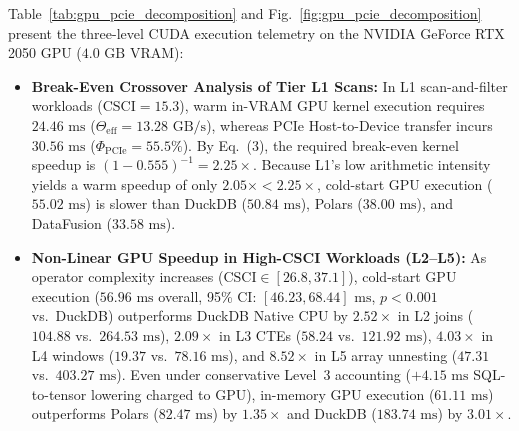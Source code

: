 \documentclass[10pt,a4paper]{article}
\begin{document}
Table~\ref{tab:gpu_pcie_decomposition} and Fig.~\ref{fig:gpu_pcie_decomposition} present the three-level CUDA execution telemetry on the NVIDIA GeForce RTX 2050 GPU ($4.0\text{ GB}$ VRAM):
\begin{itemize}[leftmargin=1.5em,itemsep=2pt]
    \item \textbf{Break-Even Crossover Analysis of Tier L1 Scans:} In L1 scan-and-filter workloads ($\text{CSCI}=15.3$), warm in-VRAM GPU kernel execution requires $24.46\text{ ms}$ ($\Theta_{\text{eff}} = 13.28\text{ GB/s}$), whereas PCIe Host-to-Device transfer incurs $30.56\text{ ms}$ ($\Phi_{\text{PCIe}} = 55.5\%$). By Eq.~(3), the required break-even kernel speedup is $(1 - 0.555)^{-1} = \mathbf{2.25\times}$. Because L1's low arithmetic intensity yields a warm speedup of only $2.05\times < 2.25\times$, cold-start GPU execution ($55.02\text{ ms}$) is slower than DuckDB ($50.84\text{ ms}$), Polars ($38.00\text{ ms}$), and DataFusion ($33.58\text{ ms}$).
    \item \textbf{Non-Linear GPU Speedup in High-CSCI Workloads (L2--L5):} As operator complexity increases ($\text{CSCI} \in [26.8, 37.1]$), cold-start GPU execution ($56.96\text{ ms}$ overall, 95\% CI: $[46.23, 68.44]\text{ ms}$, $p < 0.001$ vs.\ DuckDB) outperforms DuckDB Native CPU by $\mathbf{2.52\times}$ in L2 joins ($104.88$ vs.\ $264.53\text{ ms}$), $\mathbf{2.09\times}$ in L3 CTEs ($58.24$ vs.\ $121.92\text{ ms}$), $\mathbf{4.03\times}$ in L4 windows ($19.37$ vs.\ $78.16\text{ ms}$), and $\mathbf{8.52\times}$ in L5 array unnesting ($47.31$ vs.\ $403.27\text{ ms}$). Even under conservative Level~3 accounting ($+4.15\text{ ms}$ SQL-to-tensor lowering charged to GPU), in-memory GPU execution ($61.11\text{ ms}$) outperforms Polars ($82.47\text{ ms}$) by $1.35\times$ and DuckDB ($183.74\text{ ms}$) by $3.01\times$.
\end{itemize}
\end{document}
